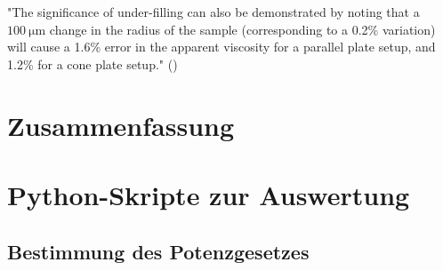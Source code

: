 \documentclass[11pt,a4paper,oneside]{scrartcl}
\begin{document}
"The significance of under-filling can also be demonstrated by
noting that a $100\ \mathrm{\mu m}$ change in the radius of the sample (corresponding to a 0.2\% variation) will cause a 1.6\% error in the
apparent viscosity for a parallel plate setup, and 1.2\% for a
cone plate setup." (\cite{Hellström_2015})
\section{Zusammenfassung}
\newpage

 

\appendix



\section{Python-Skripte zur Auswertung}
\subsection{Bestimmung des Potenzgesetzes}
%
\end{document}
